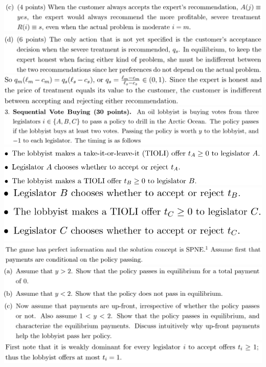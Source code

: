 \documentclass[8pt,landscape]{extarticle}
\begin{document}
\begin{multicols*}{3}
    \includegraphics[width=0.74\linewidth,keepaspectratio]{Screenshots/Screenshot 2024-03-11 134821.png}
    \includegraphics[width=0.73\linewidth,keepaspectratio]{Screenshots/Screenshot 2024-03-11 134827.png}
    \includegraphics[width=0.7\linewidth,keepaspectratio]{Screenshots/Screenshot 2024-03-11 134832.png}
    \includegraphics[width=0.77\linewidth,keepaspectratio]{Screenshots/Screenshot 2024-03-11 134854.png}
    \includegraphics[width=0.66\linewidth,keepaspectratio]{Screenshots/Screenshot 2024-03-11 134900.png}
    \includegraphics[width=0.49\linewidth,keepaspectratio]{Screenshots/Screenshot 2024-03-11 134904.png}
    \includegraphics[width=0.75\linewidth,keepaspectratio]{Screenshots/Screenshot 2024-03-11 134913.png}
    \includegraphics[width=0.74\linewidth,keepaspectratio]{Screenshots/Screenshot 2024-03-11 134923.png}
    \includegraphics[width=0.71\linewidth,keepaspectratio]{Screenshots/Screenshot 2024-03-11 134928.png}

\end{multicols*}
\end{document}
